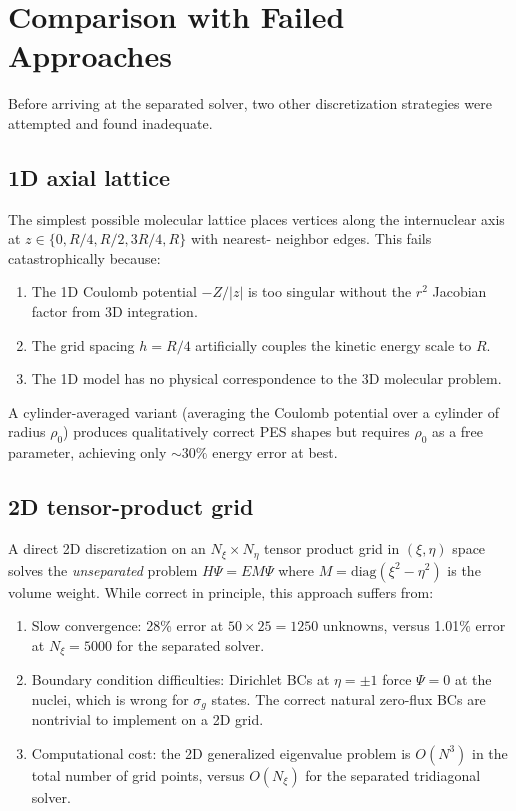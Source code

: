 \documentclass[aps,pra,twocolumn,superscriptaddress,longbibliography]{revtex4-2}
\begin{document}

\section{Comparison with Failed Approaches}
\label{app:failed}

Before arriving at the separated solver, two other discretization
strategies were attempted and found inadequate.

\subsection{1D axial lattice}

The simplest possible molecular lattice places vertices along the
internuclear axis at $z \in \{0, R/4, R/2, 3R/4, R\}$ with nearest-
neighbor edges.  This fails catastrophically because:
\begin{enumerate}
  \item The 1D Coulomb potential $-Z/|z|$ is too singular without
    the $r^2$ Jacobian factor from 3D integration.
  \item The grid spacing $h = R/4$ artificially couples the kinetic
    energy scale to $R$.
  \item The 1D model has no physical correspondence to the 3D
    molecular problem.
\end{enumerate}
A cylinder-averaged variant (averaging the Coulomb potential over
a cylinder of radius $\rho_0$) produces qualitatively correct PES
shapes but requires $\rho_0$ as a free parameter, achieving only
$\sim 30\%$ energy error at best.

\subsection{2D tensor-product grid}

A direct 2D discretization on an $N_\xi \times N_\eta$ tensor product
grid in $(\xi, \eta)$ space solves the \emph{unseparated} problem
$H\Psi = E M \Psi$ where $M = \mathrm{diag}(\xi^2 - \eta^2)$ is
the volume weight.  While correct in principle, this approach suffers
from:
\begin{enumerate}
  \item Slow convergence: 28\% error at $50 \times 25 = 1250$
    unknowns, versus 1.01\% error at $N_\xi = 5000$ for the separated
    solver.
  \item Boundary condition difficulties: Dirichlet BCs at
    $\eta = \pm 1$ force $\Psi = 0$ at the nuclei, which is wrong
    for $\sigma_g$ states.  The correct natural zero-flux BCs are
    nontrivial to implement on a 2D grid.
  \item Computational cost: the 2D generalized eigenvalue problem
    is $O(N^3)$ in the total number of grid points, versus $O(N_\xi)$
    for the separated tridiagonal solver.
\end{enumerate}
\end{document}
